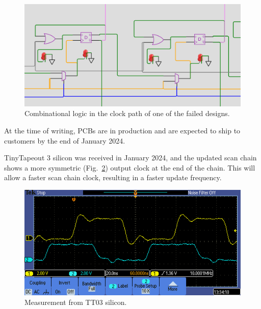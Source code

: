 \begin{figure}[!t]
\centering
\includegraphics[width=\columnwidth]{./Figs/wokwi mux clock logic.png}
\caption{Combinational logic in the clock path of one of the failed designs.}
\label{fig:failed_design_comb_logic}
\end{figure}

At the time of writing, PCBs are in production and are expected to ship to customers by the end of January 2024.

TinyTapeout 3 silicon was received in January 2024, and the updated scan chain shows a more symmetric (Fig.~\ref{fig:TT03_silicon_measurement}) output clock at the end of the chain. This will allow a faster scan chain clock, resulting in a faster update frequency.

\begin{figure}[!t]
\centering
\includegraphics[width=\columnwidth]{./Figs/tt03_clock_out.png}
\caption{Measurement from TT03 silicon.}
\label{fig:TT03_silicon_measurement}
\end{figure}
